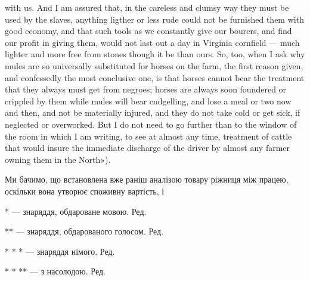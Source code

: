 {with us. And I am assured that, in the careless and clumsy way they must
be used by the slaves, anything ligther or less rude could not be furnished
them with good economy, and that such tools as we constantly give our
bourers, and find our profit in giving them, would not last out a day in
Virginia cornfield — much lighter and more free from stones though it be
than ours. So, too, when I ask why mules are so universally substituted for
horses on the farm, the first reason given, and confessedly the most conclusive
one, is that horses cannot bear the treatment that they always must get
from negroes; horses are always soon foundered or crippled by them while
mules will bear cudgelling, and lose a meal or two now and then, and not
be materially injured, and they do not take cold or get sick, if neglected
or overworked. But I do not need to go further than to the window of the room
in which I am writing, to see at almost any time, treatment of cattle
that would insure the immediate discharge of the driver by almost any farmer
owning them in the North»).
}

Ми бачимо, що встановлена вже раніш аналізою товару ріжниця
між працею, оскільки вона утворює споживну вартість, і

* — знаряддя, обдароване мовою. Ред.

** — знаряддя, обдарованого голосом. Ред.

* * * — знаряддя німого. Ред.

* * ** — з насолодою. Ред.
